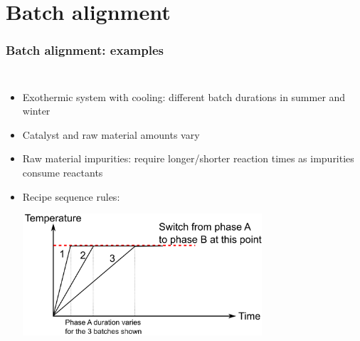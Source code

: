 \section{Batch alignment}

\begin{frame}\frametitle{Batch alignment: examples}

\begin{columns}
	
	
		\small
		\begin{itemize}
			\item	Exothermic system with cooling: different batch durations in summer and winter

			\item	Catalyst and raw material amounts vary 

			\item	Raw material impurities: require longer/shorter reaction times as impurities consume reactants
			
			\item	Recipe sequence rules:

					\begin{center}
						\includegraphics[width=0.7\textwidth]{images/alignment-due-to-phase-switching.png}
					\end{center}
		\end{itemize}
		\vspace{12pt}
		
	

\end{columns}
\end{frame}
